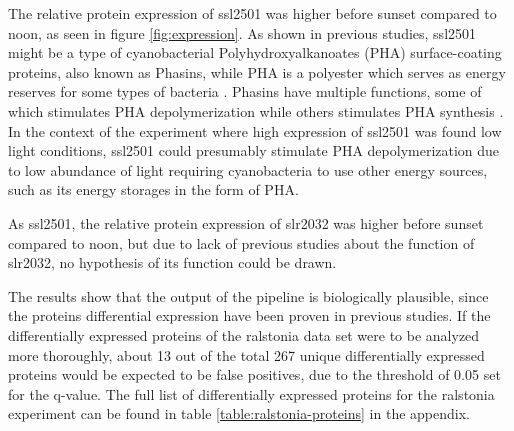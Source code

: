  The relative protein expression of ssl2501 was higher before sunset compared to noon, as seen in figure \ref{fig:expression}. As shown in previous studies, ssl2501 might be a type of cyanobacterial Polyhydroxyalkanoates (PHA) surface-coating proteins, also known as Phasins, while PHA is a polyester which serves as energy reserves for some types of bacteria \cite{phasins, ssl2501}. Phasins have multiple functions, some of which stimulates PHA depolymerization while others stimulates PHA synthesis \cite{phasins}. In the context of the experiment where high expression of ssl2501 was found low light conditions, ssl2501 could presumably stimulate PHA depolymerization due to low abundance of light requiring cyanobacteria to use other energy sources, such as its energy storages in the form of PHA.

As ssl2501, the relative protein expression of slr2032 was higher before sunset compared to noon, but due to lack of previous studies about the function of slr2032, no hypothesis of its function could be drawn.

The results show that the output of the pipeline is biologically plausible, since the proteins differential expression have been proven in previous studies. If the differentially expressed proteins of the ralstonia data set were to be analyzed more thoroughly, about 13 out of the total 267 unique  differentially expressed proteins would be expected to be false positives, due to the threshold of 0.05 set for the q-value. The full list of differentially expressed proteins for the ralstonia experiment can be found in table \ref{table:ralstonia-proteins} in the appendix.
